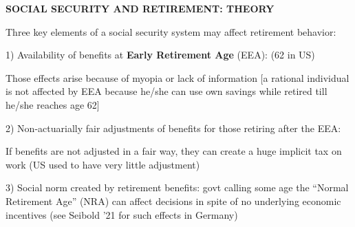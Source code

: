 \documentclass[landscape]{slides}
\begin{document}
\begin{slide}
\begin{center}
{\bf SOCIAL SECURITY AND RETIREMENT: THEORY}
\end{center}

Three key elements of a social security system may affect retirement behavior:

1) Availability of benefits at \textbf{Early Retirement Age} (EEA): (62 in US)

\small
Those effects arise because of myopia or lack of information [a rational individual is
not affected by EEA because he/she can use own savings while retired till he/she reaches age 62]

\normalsize
2) Non-actuarially fair adjustments of benefits for those retiring after the EEA:

\small
If benefits are not adjusted in a fair way, they can create a huge implicit tax on work (US used
to have very little adjustment)

\normalsize
3) Social norm created by retirement benefits: govt calling some age the ``Normal Retirement Age'' (NRA) can affect decisions in spite of no underlying economic incentives (see Seibold '21 for such effects in Germany)

\end{slide}



\begin{slide}

\end{slide}


%
%
%
%
%
%
%
\end{document}
